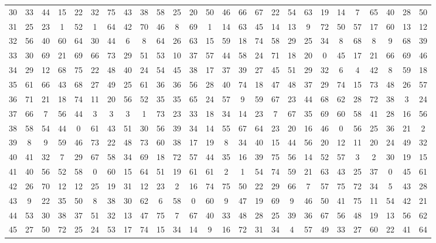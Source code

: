 \begin{table}
\begin{tabular}{c c c c c c c c c c c c c c c c c c c c c c c c c c }
30 & 33 & 44 & 15 & 22 & 32 & 75 & 43 & 38 & 58 & 25 & 20 & 50 & 46 & 66 & 67 & 22 & 54 & 63 & 19 & 14 & 7 & 65 & 40 & 28 & 50 \\
31 & 25 & 23 & 1 & 52 & 1 & 64 & 42 & 70 & 46 & 8 & 69 & 1 & 14 & 63 & 45 & 14 & 13 & 9 & 72 & 50 & 57 & 17 & 60 & 13 & 12 \\
32 & 56 & 40 & 60 & 64 & 30 & 44 & 6 & 8 & 64 & 26 & 63 & 15 & 59 & 18 & 74 & 58 & 29 & 25 & 34 & 8 & 68 & 8 & 9 & 68 & 39 \\
33 & 30 & 69 & 21 & 69 & 66 & 73 & 29 & 51 & 53 & 10 & 37 & 57 & 44 & 58 & 24 & 71 & 18 & 20 & 0 & 45 & 17 & 21 & 66 & 69 & 46 \\
34 & 29 & 12 & 68 & 75 & 22 & 48 & 40 & 24 & 54 & 45 & 38 & 17 & 37 & 39 & 27 & 45 & 51 & 29 & 32 & 6 & 4 & 42 & 8 & 59 & 18 \\
35 & 61 & 66 & 43 & 68 & 27 & 49 & 25 & 61 & 36 & 36 & 56 & 28 & 40 & 74 & 18 & 47 & 48 & 37 & 29 & 74 & 15 & 73 & 48 & 26 & 57 \\
36 & 71 & 21 & 18 & 74 & 11 & 20 & 56 & 52 & 35 & 35 & 65 & 24 & 57 & 9 & 59 & 67 & 23 & 44 & 68 & 62 & 28 & 72 & 38 & 3 & 24 \\
37 & 66 & 7 & 56 & 44 & 3 & 3 & 3 & 1 & 73 & 23 & 33 & 18 & 34 & 14 & 23 & 7 & 67 & 35 & 69 & 60 & 58 & 41 & 28 & 16 & 56 \\
38 & 58 & 54 & 44 & 0 & 61 & 43 & 51 & 30 & 56 & 39 & 34 & 14 & 55 & 67 & 64 & 23 & 20 & 16 & 46 & 0 & 56 & 25 & 36 & 21 & 2 \\
39 & 8 & 9 & 59 & 46 & 73 & 22 & 48 & 73 & 60 & 38 & 17 & 19 & 8 & 34 & 40 & 15 & 44 & 56 & 20 & 12 & 11 & 20 & 24 & 49 & 32 \\
40 & 41 & 32 & 7 & 29 & 67 & 58 & 34 & 69 & 18 & 72 & 57 & 44 & 35 & 16 & 39 & 75 & 56 & 14 & 52 & 57 & 3 & 2 & 30 & 19 & 15 \\
41 & 40 & 56 & 52 & 58 & 0 & 60 & 15 & 64 & 51 & 19 & 61 & 61 & 2 & 1 & 54 & 74 & 59 & 21 & 63 & 43 & 25 & 37 & 0 & 45 & 61 \\
42 & 26 & 70 & 12 & 12 & 25 & 19 & 31 & 12 & 23 & 2 & 16 & 74 & 75 & 50 & 22 & 29 & 66 & 7 & 57 & 75 & 72 & 34 & 5 & 43 & 28 \\
43 & 9 & 22 & 35 & 50 & 8 & 38 & 30 & 62 & 6 & 58 & 0 & 60 & 9 & 47 & 19 & 69 & 9 & 46 & 50 & 41 & 75 & 11 & 54 & 42 & 21 \\
44 & 53 & 30 & 38 & 37 & 51 & 32 & 13 & 47 & 75 & 7 & 67 & 40 & 33 & 48 & 28 & 25 & 39 & 36 & 67 & 56 & 48 & 19 & 13 & 56 & 62 \\
45 & 27 & 50 & 72 & 25 & 24 & 53 & 17 & 74 & 15 & 34 & 14 & 9 & 16 & 72 & 31 & 34 & 4 & 57 & 49 & 33 & 27 & 60 & 22 & 41 & 64 \\

\end{tabular}
\end{table}
